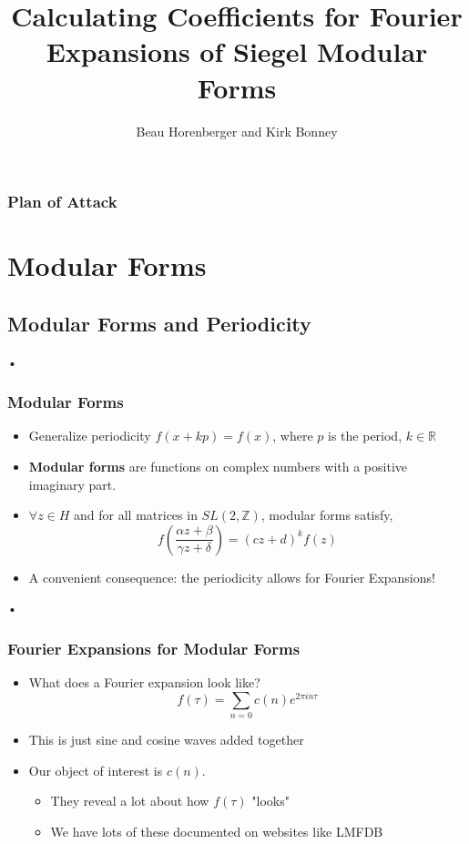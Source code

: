 \documentclass[11pt]{beamer}
\author{Beau Horenberger and Kirk Bonney}
\title{Calculating Coefficients for Fourier Expansions of Siegel Modular Forms}
\institute{University of Idaho}
\begin{document}
\begin{frame}
\titlepage
\end{frame}

\begin{frame}
\frametitle{Plan of Attack}
\tableofcontents
\end{frame}

\section{Modular Forms}
\subsection{Modular Forms and Periodicity}
\begin{frame}{•}
\frametitle{Modular Forms}
\begin{itemize}
\item Generalize periodicity $f(x+kp)=f(x)$, where $p$ is the period, $k\in \mathbb{R}$
\item \textbf{Modular forms} are functions on complex numbers with a positive imaginary part. 
\item $\forall z \in H$ and for all matrices in $SL(2, \mathbb{Z})$, modular forms satisfy,
	$$f\left( \frac{\alpha z + \beta}{\gamma z + \delta} \right) = (cz+d)^k f(z)$$
\item A convenient consequence: the periodicity allows for Fourier Expansions!
\end{itemize}
\end{frame}

\begin{frame}{•}
\frametitle{Fourier Expansions for Modular Forms}
\begin{itemize}
\item What does a Fourier expansion look like? $$f(\tau) = \sum_{n=0}c(n)e^{2\pi i n \tau}$$
\item This is just sine and cosine waves added together
\item Our object of interest is $c(n)$.
\begin{itemize}
\item They reveal a lot about how $f(\tau)$ "looks"
\item We have lots of these documented on websites like LMFDB
\end{itemize}
\end{itemize}
\end{frame}
\end{document}
